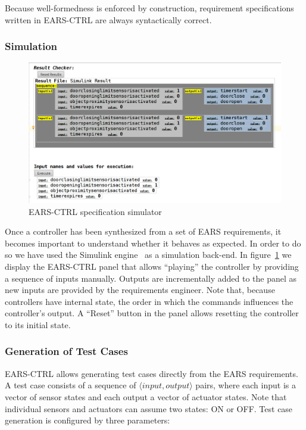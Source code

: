 Because well-formedness is enforced by construction, requirement specifications
written in \textsf{EARS-CTRL} are always syntactically correct. 

\subsubsection{Simulation}

\begin{figure}[h!]
   \begin{center}
     \includegraphics[width=1\textwidth]{images/simulation.png}
     \caption{\textsf{EARS-CTRL} specification simulator}
     \label{fig:ears_simulator}
   \end{center}
 \end{figure}

Once a controller has been synthesized from a set of EARS requirements, it
becomes important to understand whether it behaves as expected. In order to do
so we have used the Simulink engine~\cite{simulink} as a simulation back-end.
In figure~\ref{fig:ears_simulator} we display the \textsf{EARS-CTRL} panel that
allows ``playing'' the controller by providing a sequence of inputs manually.
Outputs are incrementally added to the panel as new inputs are provided by the
requirements engineer. Note that, because controllers have internal state,
the order in which the commands influences the controller's output. A ``Reset''
button in the panel allows resetting the controller to its initial state.

\subsubsection{Generation of Test Cases}

\textsf{EARS-CTRL} allows generating test cases directly from the EARS
requirements. A test case consists of a sequence of $\langle
input, output \rangle$ pairs, where each input is a vector of sensor states
and each output a vector of actuator states. Note that individual sensors and
actuators can assume two states: \textsf{ON} or \textsf{OFF}. Test case
generation is configured by three parameters:

